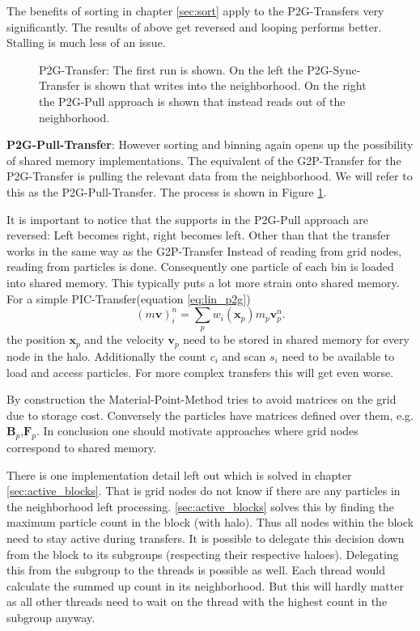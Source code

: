 \documentclass[m,times]{cgMA}
\begin{document}
The benefits of sorting in chapter \ref{sec:sort} apply to the P2G-Transfers very significantly. The results of above get reversed and looping performs better. Stalling is much less of an issue.

\begin{figure}[t]
    \centering
  
  \caption{P2G-Transfer: The first run is shown. On the left the P2G-Sync-Transfer is shown that writes into the neighborhood. On the right the P2G-Pull approach is shown that instead reads out of the neighborhood.}
  \label{fig:p2g_transfer}
\end{figure}

\textbf{P2G-Pull-Transfer}: However sorting and binning again opens up the possibility of shared memory implementations. The equivalent of the G2P-Transfer for the P2G-Transfer is pulling the relevant data from the neighborhood. We will refer to this as the P2G-Pull-Transfer. The process is shown in Figure \ref{fig:p2g_transfer}.

It is important to notice that the supports in the P2G-Pull approach are reversed: Left becomes right, right becomes left. Other than that the transfer works in the same way as the G2P-Transfer Instead of reading from grid nodes, reading from particles is done. Consequently one particle of each bin is loaded into shared memory. This typically puts a lot more strain onto shared memory. For a simple PIC-Transfer(equation \ref{eq:lin_p2g})
$$
(m\boldsymbol{v})_i^n = \sum_p w_{i}(\boldsymbol{x}_p)m_p\boldsymbol{v}^n_p.
$$
the position $\boldsymbol{x}_p$ and the velocity $\boldsymbol{v}_p$ need to be stored in shared memory for every node in the halo. Additionally the count $c_i$ and scan $s_i$ need to be available to load and access particles. For more complex transfers this will get even worse.

By construction the Material-Point-Method tries to avoid matrices on the grid due to storage cost. Conversely the particles have matrices defined over them, e.g. $\boldsymbol{B}_p$,$\boldsymbol{F}_p$. In conclusion one should motivate approaches where grid nodes correspond to shared memory.

There is one implementation detail left out which is solved in chapter \ref{sec:active_blocks}. That is grid nodes do not know if there are any particles in the neighborhood left processing. \ref{sec:active_blocks} solves this by finding the maximum particle count in the block (with halo). Thus all nodes within the block need to stay active during transfers. It is possible to delegate this decision down from the block to its subgroups (respecting their respective haloes). Delegating this from the subgroup to the threads is possible as well. Each thread would calculate the summed up count in its neighborhood. But this will hardly matter as all other threads need to wait on the thread with the highest count in the subgroup anyway.
\end{document}
